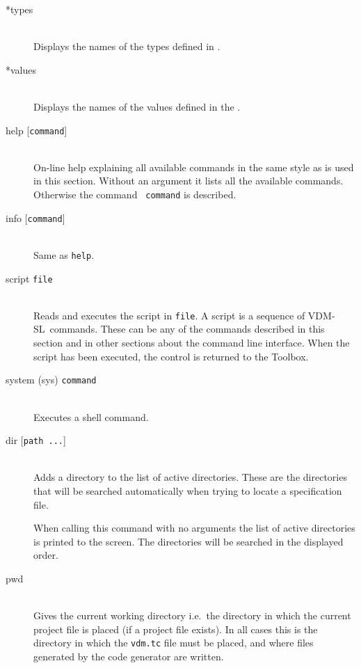 \documentclass[\pformat,12pt]{article}
\newcommand{\vdmslpp}{VDM-SL}
\newcommand{\Toolbox}{Toolbox}
\newcommand{\vdmslpp}{VDM++}
\newcommand{\Toolbox}{Toolbox}
\begin{document}
\begin{description}
\item[*types] \mbox{}\\ 
  Displays the names of the types defined in
  .

\item[*values] \mbox{}\\ 
  Displays the names of the values defined in the 
  .

\item[help \mbox{[{\tt command}]}] \mbox{}\\
  On-line help explaining all available commands in
  the same style as is used in this section. Without an argument it
  lists all the available commands. Otherwise the command {\tt
    command} is described.

\item[info \mbox{[{\tt command}]}] \mbox{}\\
  Same as {\tt help}.

\item[script {\tt file}] \mbox{}\\
  Reads and executes the script in {\tt file}.  A script is a
  sequence of \vdmslpp\ commands.  These can be any of the commands
  described in this section and in other sections about the
  command line interface.  When the script has been executed, the
  control is returned to the \Toolbox.

\item[system (sys) {\tt command}]\mbox{}\\
  Executes a shell command.

\item[dir \mbox{[{\tt path ...}]}] \mbox{}\\
  Adds a directory to the list of active directories. These are the
  directories that will be searched automatically when trying to
  locate a specification file.
  
  When calling this command with no arguments the list of active
  directories is printed to the screen. The directories will be
  searched in the displayed order.

\item[pwd]  \mbox{}\\
  Gives the current working directory i.e.\ the directory in which
  the current project file is placed (if a project file exists). In
  all cases this is the directory in which the \texttt{vdm.tc} file must
  be placed, and where files generated by the code generator
   are written.


\end{description}
\end{document}
